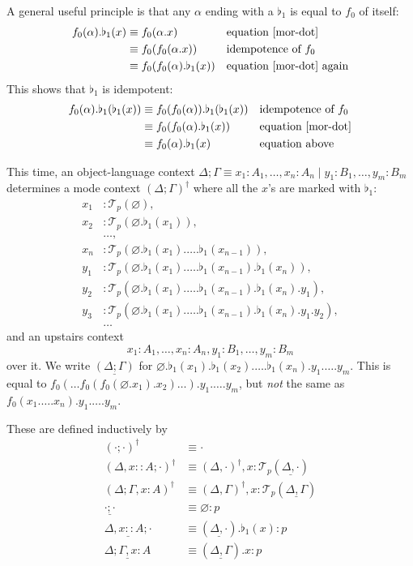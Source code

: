 \documentclass[10pt]{article}
\theoremstyle{definition}
\let\emptyset\varnothing
\newcommand\El[2]{\mathcal{T}_{#1}(#2)}
\begin{document}
A general useful principle is that any $\alpha$ ending with a $\flat_1$ is equal to $f_0$ of itself:
\begin{align*}
f_0(\alpha).\flat_1(x)
&\equiv f_0(\alpha.x) && \text{equation \eqref{mor-dot}} \\
&\equiv f_0(f_0(\alpha.x)) && \text{idempotence of $f_0$} \\
&\equiv f_0(f_0(\alpha).\flat_1(x)) && \text{equation \eqref{mor-dot} again} \\
\end{align*} 
This shows that $\flat_1$ is idempotent:
\begin{align*}
f_0(\alpha).\flat_1(\flat_1(x)) 
&\equiv f_0(f_0(\alpha)).\flat_1(\flat_1(x)) && \text{idempotence of $f_0$} \\
&\equiv f_0(f_0(\alpha).\flat_1(x)) && \text{equation \eqref{mor-dot}}  \\
&\equiv f_0(\alpha).\flat_1(x) && \text{equation above} 
\end{align*}

This time, an object-language context $\Delta; \Gamma \equiv x_1 : A_1, \ldots , x_n : A_n \mid y_1 : B_1, \ldots , y_m : B_m$
  determines a mode context $(\Delta; \Gamma)^\dagger$ where all the $x$'s are marked with $\flat_1$:
  \begin{align*}
  x_1 &: \El{p}{\emptyset}, \\ 
  x_2 &: \El{p}{\emptyset.\flat_1(x_1)}, \\ 
  &\ldots, \\
  x_{n} &: \El{p}{\emptyset.\flat_1(x_1).\ldots.\flat_1(x_{n-1})}, \\
  y_1 &: \El{p}{\emptyset.\flat_1(x_1).\ldots.\flat_1(x_{n-1}).\flat_1(x_{n})}, \\
  y_2 &: \El{p}{\emptyset.\flat_1(x_1).\ldots.\flat_1(x_{n-1}).\flat_1(x_{n}).y_1}, \\
   y_3 &: \El{p}{\emptyset.\flat_1(x_1).\ldots.\flat_1(x_{n-1}).\flat_1(x_{n}).y_1.y_2}, \\
  &\ldots
\end{align*}
  and an upstairs context
  \[x_1 : A_1, \ldots , x_n : A_n, y_1 : B_1, \ldots , y_m : B_m
  \]
  over it.  We write $\underline{(\Delta ; \Gamma)}$ for
  $\emptyset.\flat_1(x_1).\flat_1(x_2).\ldots.\flat_1(x_n).y_1.\dots.y_m$. This is equal to $f_0(\dots  f_0(f_0(\emptyset.x_1).x_2) \dots).y_1.\dots.y_m$, but \emph{not} the same as $f_0(x_1.\dots.x_n).y_1.\dots.y_m$.

These are defined inductively by
\begin{align*}
(\cdot; \cdot)^\dagger &\equiv \cdot \\
(\Delta, x :: A; \cdot)^\dagger &\equiv (\Delta, \cdot)^\dagger, x : \El{p}{\underline{\Delta, \cdot}} \\
(\Delta ; \Gamma, x : A)^\dagger &\equiv (\Delta, \Gamma)^\dagger, x : \El{p}{\underline{\Delta, \Gamma}} \\
\underline{\cdot ; \cdot} &\equiv \emptyset : p \\
\underline{\Delta, x :: A; \cdot} &\equiv (\underline{\Delta, \cdot}).\flat_1(x) : p\\
\underline{\Delta; \Gamma, x : A} &\equiv (\underline{\Delta, \Gamma}).x : p
\end{align*}
\end{document}
